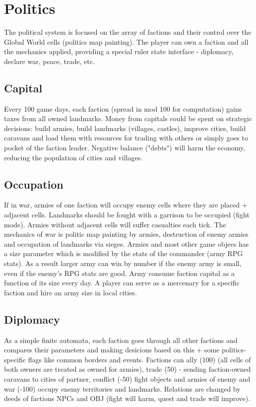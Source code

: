 \section{Politics}
\label{sec:politics}

The political system is focused on the array of factions and their control over the Global World cells (politics map painting). The player can own a faction and all the mechanics applied, providing a special ruler state interface - diplomacy, declare war, peace, trade, etc.

\subsection{Capital}

Every 100 game days, each faction (spread in mod 100 for computation) gains taxes from all owned landmarks. Money from capitals could be spent on strategic decisions: build armies, build landmarks (villages, castles), improve cities, build caravans and load them with resources for trading with others or simply goes to pocket of the faction leader. Negative balance ("debts") will harm the economy, reducing the population of cities and villages. 

\subsection{Occupation}

If in war, armies of one faction will occupy enemy cells where they are placed + adjacent cells. Landmarks should be fought with a garrison to be occupied (fight mode). Armies without adjacent cells will suffer casualties each tick. The mechanics of war is politic map painting by armies, destruction of enemy armies and occupation of landmarks via sieges. Armies and most other game objecs has a size parameter which is modified by the stats of the commander (army RPG stats). As a result larger army can win by number if the enemy army is small, even if the enemy's RPG stats are good. Army consume faction capital as a function of its size every day. A player can serve as a mercenary for a specific faction and hire an army size in local cities.

\subsection{Diplomacy}

As a simple finite automata, each faction goes through all other factions and compares their parameters and making desicions based on this + some politics-specific flags like common borders and events. Factions can ally (100) (all cells of both owners are treated as owned for armies), trade (50) - sending faction-owned caravans to cities of partner, conflict (-50) fight objects and armies of enemy and war (-100) occupy enemy territories and landmarks. Relations are changed by deeds of factions NPCs and OBJ (fight will harm, quest and trade will improve).